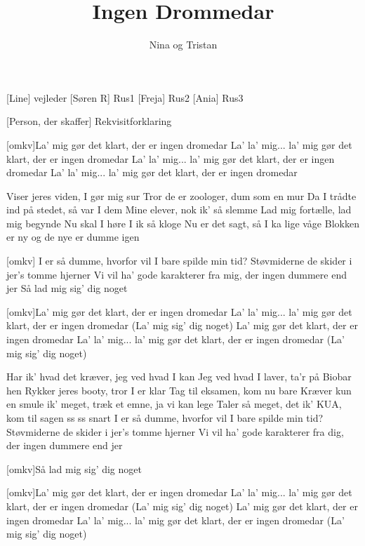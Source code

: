 \documentclass[a4paper,11pt]{article}
\title{Ingen Drommedar}
\author{Nina og Tristan}
\begin{document}
\maketitle

\begin{roles}
    [Line] vejleder
[Søren R] Rus1
[Freja] Rus2
[Ania] Rus3
\end{roles}

\begin{props}
    [Person, der skaffer] Rekvisitforklaring
\end{props}

\begin{song}

  [omkv]La' mig gør det klart, der er ingen dromedar
La' la' mig... la' mig gør det klart, der er ingen dromedar
La' la' mig... la' mig gør det klart, der er ingen dromedar
La' la' mig... la' mig gør det klart, der er ingen dromedar

   Viser jeres viden, I gør mig sur
Tror de er zoologer, dum som en mur
Da I trådte ind på stedet, så var I dem
Mine elever, nok ik’ så slemme
Lad mig fortælle, lad mig begynde
Nu skal I høre I ik så kloge
Nu er det sagt, så I ka lige våge
Blokken er ny og de nye er dumme igen

[omkv] I er så dumme, hvorfor vil I bare spilde min tid?
Støvmiderne de skider i jer’s tomme hjerner 
Vi vil ha’ gode karakterer fra mig, der ingen dummere end jer
Så lad mig sig’ dig noget

[omkv]La' mig gør det klart, der er ingen dromedar
La' la' mig... la' mig gør det klart, der er ingen dromedar
(La' mig sig’ dig noget)
La' mig gør det klart, der er ingen dromedar
La' la' mig... la' mig gør det klart, der er ingen dromedar  
(La' mig sig’ dig noget)

 Har ik’ hvad det kræver, jeg ved hvad I kan
Jeg ved hvad I laver, ta'r på Biobar hen
Rykker jeres booty, tror I er klar
Tag til eksamen, kom nu bare
Kræver kun en smule ik’ meget, træk et emne, ja vi kan lege
Taler så meget, det ik’ KUA, kom til sagen ss ss snart
I er så dumme, hvorfor vil I bare spilde min tid?
Støvmiderne de skider i jer’s tomme hjerner 
Vi vil ha’ gode karakterer fra dig, der ingen dummere end jer

[omkv]Så lad mig sig’ dig noget

[omkv]La' mig gør det klart, der er ingen dromedar
La' la' mig... la' mig gør det klart, der er ingen dromedar
(La' mig sig’ dig noget)
La' mig gør det klart, der er ingen dromedar
La' la' mig... la' mig gør det klart, der er ingen dromedar  
(La' mig sig’ dig noget)


\end{song}
\end{document}

